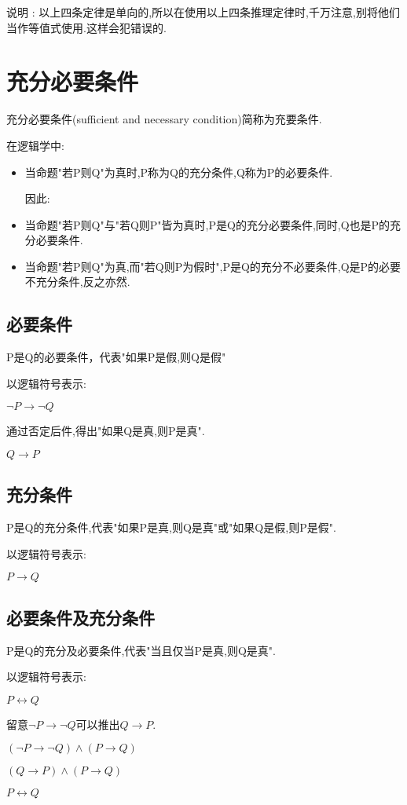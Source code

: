 {{{    说明 : 以上四条定律是单向的,所以在使用以上四条推理定律时,千万注意,别将他们当作等值式使用.这样会犯错误的.
  }%

  }%

  \section{充分必要条件}{

    充分必要条件(sufficient and necessary condition)简称为充要条件.

    在逻辑学中:
    \begin{itemize}
      \item 当命题"若P则Q"为真时,P称为Q的充分条件,Q称为P的必要条件.

            因此:

      \item 当命题"若P则Q"与"若Q则P"皆为真时,P是Q的充分必要条件,同时,Q也是P的充分必要条件.
      \item 当命题"若P则Q"为真,而"若Q则P为假时",P是Q的充分不必要条件,Q是P的必要不充分条件,反之亦然.
    \end{itemize}

    \subsection{必要条件}{
      P是Q的必要条件，代表"如果P是假,则Q是假"

      以逻辑符号表示:

      $\lnot P \to \lnot Q$

      通过否定后件,得出"如果Q是真,则P是真".

      $Q \to P$
    }%

    \subsection{充分条件}{
      P是Q的充分条件,代表"如果P是真,则Q是真"或"如果Q是假,则P是假".

      以逻辑符号表示:

      $P \to Q$
    }%

    \subsection{必要条件及充分条件}{
      P是Q的充分及必要条件,代表"当且仅当P是真,则Q是真".

      以逻辑符号表示:

      $P \leftrightarrow Q$

      留意$\lnot P \to \lnot Q$可以推出$Q \to P$.

      $(\lnot P \to \lnot Q) \land (P \to Q)$

      $(Q \to P) \land (P \to Q)$

      $P \leftrightarrow Q$
    }%

   }%

}%